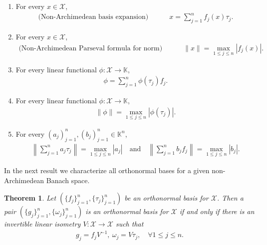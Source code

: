 \documentclass{amsart}
\newtheorem{theorem}{Theorem}[section]
\begin{document}
\begin{enumerate}[\upshape(i)]
	\item For every $x \in \mathcal{X}$, 
	\begin{align*}
		\text{(Non-Archimedean basis expansion)}\quad \quad \quad 	x=\sum_{j=1}^{n}f_j(x)  \tau_j.
	\end{align*}
	\item For every $x \in \mathcal{X}$, 
	\begin{align*}
		\text{(Non-Archimedean Parseval formula for norm)}\quad \quad \quad	\|x\|=\displaystyle \max_{1\leq j\leq n}|f_j(x)|.
	\end{align*}
\item For every linear functional $\phi: \mathcal{X}\to \mathbb{K}$, 
\begin{align*}
\phi=\sum_{j=1}^{n}\phi(\tau_j)f_j.	
\end{align*}
\item For every linear functional $\phi: \mathcal{X}\to \mathbb{K}$, 
\begin{align*}
	\|\phi\|=\displaystyle \max_{1\leq j\leq n}|\phi(\tau_j)|.
\end{align*}
	\item For every $(a_j)_{j=1}^n, (b_j)_{j=1}^n \in \mathbb{K}^n$, 
	\begin{align*}
		\left\|\sum_{j=1}^na_j\tau_j \right\|=\displaystyle \max_{1\leq j\leq n}|a_j| \quad \text{and} \quad 	\left\|\sum_{j=1}^nb_jf_j \right\|=\displaystyle \max_{1\leq j\leq n}|b_j|.
	\end{align*}
\end{enumerate}
In the next result we characterize all orthonormal bases for a given non-Archimedean Banach  space.
\begin{theorem}
	Let $(\{f_j\}_{j=1}^n, \{\tau_j\}_{j=1}^n)$ be an orthonormal basis for $\mathcal{X}$. Then a pair 	$(\{g_j\}_{j=1}^n, \{\omega_j\}_{j=1}^n)$ is an orthonormal basis for $\mathcal{X}$ if and only if there is an invertible linear isometry $V:\mathcal{X} \to \mathcal{X}$ such that 
	\begin{align*}
		g_j=f_jV^{-1}, ~ \omega_j=V\tau_j, \quad \forall 1\leq j \leq n.
	\end{align*}
\end{theorem}
\end{document}
